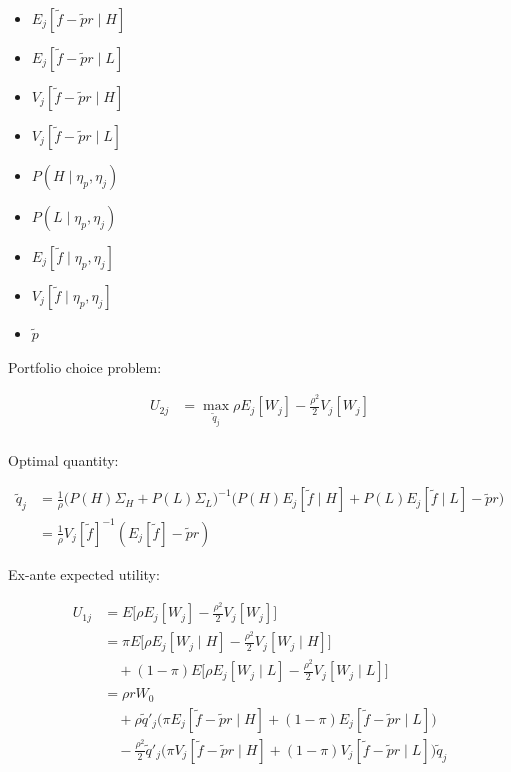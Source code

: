 \documentclass{article}
\begin{document}
\begin{itemize}
    \item $E_j[\tilde f - \tilde p r \mid H]$
    \item $E_j[\tilde f - \tilde p r \mid L]$
    \item $V_j[\tilde f - \tilde p r \mid H]$
    \item $V_j[\tilde f - \tilde p r \mid L]$
    \item $P(H \mid \eta_p, \eta_j)$
    \item $P(L \mid \eta_p, \eta_j)$
    \item $E_j[\tilde f \mid \eta_p, \eta_j]$
    \item $V_j[\tilde f \mid \eta_p, \eta_j]$
    \item $\tilde p$
\end{itemize}

Portfolio choice problem:

\begin{align*}
    U_{2j} &= \max_{\tilde q_j}
        \rho E_j [W_j] - \frac{\rho^2}{2} V_j [W_j] \\
\end{align*}

Optimal quantity:

\begin{align*}
    \tilde q_j &= \frac1\rho \bigg( P(H) \Sigma_H + P(L) \Sigma_L \bigg)^{-1} \bigg(
        P(H) E_j [\tilde f \mid H] + P(L) E_j [\tilde f \mid L] - \tilde p r
    \bigg) \\
    &= \frac1\rho V_j[\tilde f]^{-1} (E_j [\tilde f] - \tilde p r)
\end{align*}

Ex-ante expected utility:

\begin{align*}
    U_{1j} &= E\biggl[
        \rho E_j [W_j] - \frac{\rho^2}{2} V_j [W_j]
    \biggr] \\
    &= 
        \pi E\biggl[
            \rho E_j [W_j \mid H] - \frac{\rho^2}{2} V_j [W_j \mid H]
        \biggr] \\
        &\quad +
        (1-\pi) E\biggl[
            \rho E_j [W_j \mid L] - \frac{\rho^2}{2} V_j [W_j \mid L]
        \biggr] \\
    &= \rho r W_0 \\
        &\quad + 
        \rho \tilde q'_j \biggl(
            \pi E_j [\tilde f - \tilde p r \mid H] +
            (1-\pi) E_j [\tilde f - \tilde p r \mid L]
        \biggr) \\
        &\quad -
        \frac{\rho^2}{2} \tilde q'_j \biggl(
            \pi V_j [\tilde f - \tilde p r \mid H] +
            (1-\pi) V_j [\tilde f - \tilde p r \mid L]
        \biggr) \tilde q_j
\end{align*}


\end{document}
